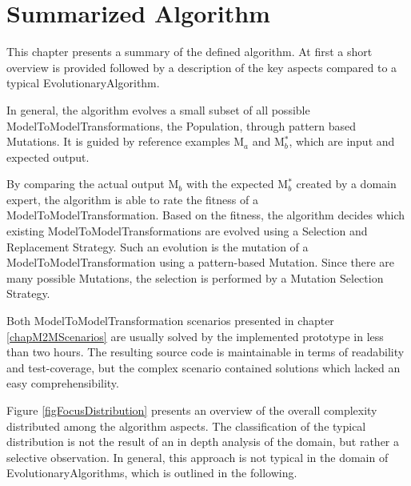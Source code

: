 \chapter{Summarized Algorithm}\label{secSummarizedApproach}

This chapter presents a summary of the defined algorithm. At first a short overview is provided followed by a description of the key aspects compared to a typical \gls{EvolutionaryAlgorithm}.

In general, the algorithm evolves a small subset of all possible \glspl{ModelToModelTransformation}, the \gls{Population}, through pattern based \glspl{Mutation}. It is guided by reference examples M$_a$ and M$_b^*$, which are input and expected output. 

By comparing the actual output M$_b$ with the expected M$_b^*$ created by a domain expert, the algorithm is able to rate the fitness of a \gls{ModelToModelTransformation}. Based on the fitness, the algorithm decides which existing \glspl{ModelToModelTransformation} are evolved using a Selection and Replacement Strategy. Such an evolution is the mutation of a \gls{ModelToModelTransformation} using a pattern-based \gls{Mutation}. Since there are many possible \glspl{Mutation}, the selection is performed by a Mutation Selection Strategy.


Both \gls{ModelToModelTransformation} scenarios presented in chapter \ref{chapM2MScenarios} are usually solved by the implemented prototype in less than two hours. The resulting source code is maintainable in terms of readability and test-coverage, but the complex scenario contained solutions which lacked an easy comprehensibility.

Figure \ref{figFocusDistribution} presents an overview of the overall complexity distributed among the algorithm aspects. The classification of the typical distribution is not the result of an in depth analysis of the domain, but rather a selective observation. In general, this approach is not typical in the domain of \glspl{EvolutionaryAlgorithm}, which is outlined in the following.

